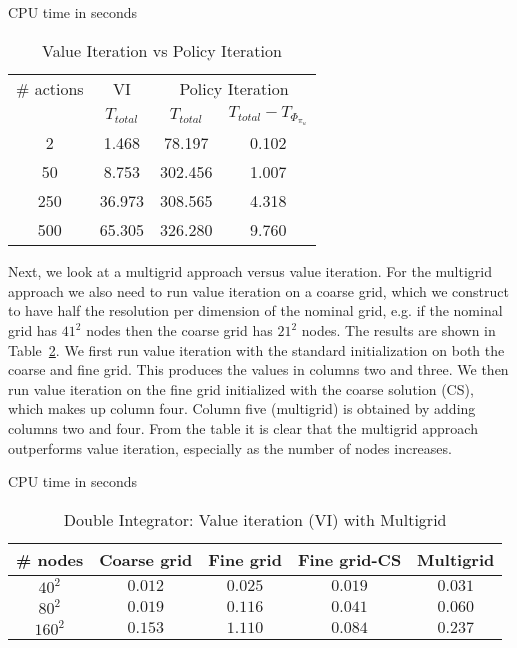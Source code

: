 \begin{table}
\centering
\caption{Value Iteration vs Policy Iteration} CPU time in seconds \\
\label{tab:v_vs_p}
\begin{tabular}{|c| c| c| c|}
\hline
\# actions & VI & \multicolumn{2}{|c|}{Policy Iteration} \\ \cline{3-4}
 &  $T_{total} $ & $T_{total}$ & $T_{total} - T_{\Phi_{\pi_u}}$ \\ \hline
2 & 1.468  & 78.197  & 0.102 \\ \hline
50 &  8.753 &  302.456 & 1.007 \\ \hline
250 & 36.973 &  308.565 & 4.318 \\ \hline
500 & 65.305 &  326.280 & 9.760\\
\hline
\end{tabular}
\end{table}

Next, we look at a multigrid approach versus value iteration. For the multigrid approach we also need to run value iteration on a coarse grid, which we construct to have half the resolution per dimension of the nominal grid, e.g. if the nominal grid has $41^2$ nodes then the coarse grid has $21^2$ nodes. The results are shown in Table~\ref{tab:multigrid_di}. We first run value iteration with the standard initialization on both the coarse and fine grid. This produces the values in columns two and three. We then run value iteration on the fine grid initialized with the coarse solution (CS), which makes up column four. Column five (multigrid) is obtained by adding columns two and four. From the table it is clear that the multigrid approach outperforms value iteration, especially as the number of nodes increases.

\begin{table}
\centering
\caption{Double Integrator: Value iteration (VI) with Multigrid} CPU time in seconds
\label{tab:multigrid_di}
\begin{tabular}{|c| c| c| c| c| }
\hline
\# nodes & Coarse grid & Fine grid &  Fine grid-CS & Multigrid \\ \hline
$40^2$ & $0.012$ & $0.025$ & $0.019$ & $0.031$ \\ \hline
$80^2$ & $0.019$ & $0.116$ & $0.041$ & $0.060$\\ \hline
$160^2$ & $0.153$ & $1.110$ & $0.084$ & $0.237$\\ \hline
\end{tabular}
\end{table}

